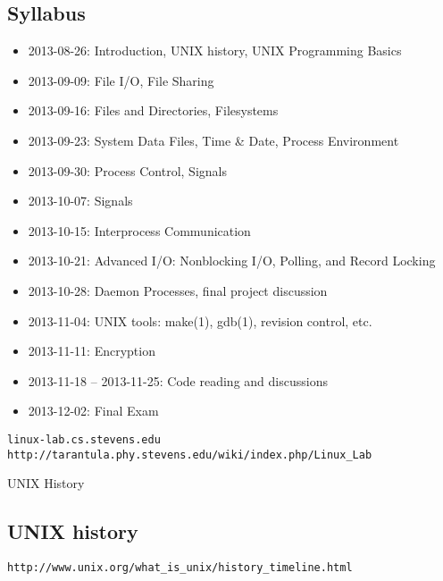 \documentclass[xga]{xdvislides}
\begin{document}
\subsection{Syllabus}
\begin{itemize}
	\item 2013-08-26: Introduction, UNIX history, UNIX Programming Basics
	\item 2013-09-09: File I/O, File Sharing
	\item 2013-09-16: Files and Directories, Filesystems
	\item 2013-09-23: System Data Files, Time \& Date, Process Environment
	\item 2013-09-30: Process Control, Signals
	\item 2013-10-07: Signals
	\item 2013-10-15: Interprocess Communication
	\item 2013-10-21: Advanced I/O: Nonblocking I/O, Polling, and Record Locking
	\item 2013-10-28: Daemon Processes, final project discussion
	\item 2013-11-04: UNIX tools: make(1), gdb(1), revision control, etc.
	\item 2013-11-11: Encryption
	\item 2013-11-18 -- 2013-11-25: Code reading and discussions
	\item 2013-12-02: Final Exam
\end{itemize}

\pagebreak

\vspace*{\fill}
\begin{center}
  \Hugesize
    {\tt linux-lab.cs.stevens.edu}
	\hspace*{5mm}\blueline\\ [1em]
  \Normalsize
{\tt http://tarantula.phy.stevens.edu/wiki/index.php/Linux\_Lab}
\end{center}
\vspace*{\fill}

\pagebreak

\vspace*{\fill}
\begin{center}
  \Hugesize
    UNIX History
	\hspace*{5mm}\blueline\\ [1em]
  \Normalsize
\end{center}
\vspace*{\fill}

\subsection{UNIX history}
\verb+http://www.unix.org/what_is_unix/history_timeline.html+ \\
\end{document}
